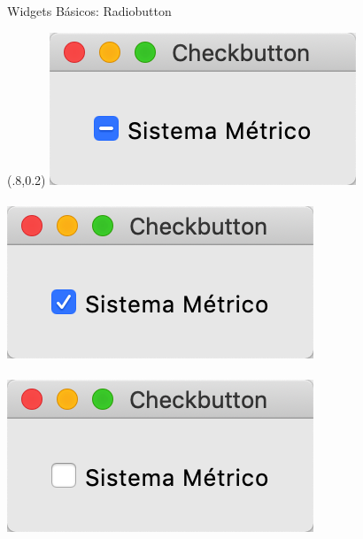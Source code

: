 \documentclass[10pt, envcountsect , spanish]{beamer}
\begin{document}
\begin{frame}[fragile]{Widgets Básicos: Radiobutton}
\begin{textblock*}{.30\textwidth}(.8\textwidth,0.2\textheight)
\includegraphics[width=\textwidth]{fig/Checkbutton1}\\
\; \\
\includegraphics[width=\textwidth]{fig/Checkbutton2}\\
\; \\
\includegraphics[width=\textwidth]{fig/Checkbutton3}
\end{textblock*}
\end{frame}
\end{document}
